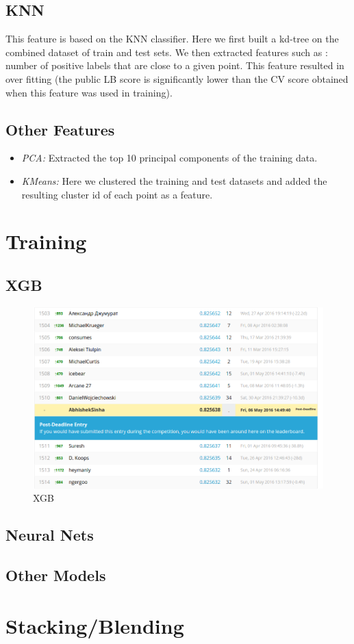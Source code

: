 \documentclass{article}
\begin{document}
\subsection{KNN}
This feature is based on the KNN classifier. Here we first built a kd-tree on the combined dataset of train and test sets. We then
extracted features such as : number of positive labels that are close to a given point. This feature resulted in over fitting (the public LB score is significantly lower than the CV score obtained when this feature was used in training).
\subsection{Other Features}
\begin{itemize}
\item \textit{PCA:} Extracted the top 10 principal components of the training data.
\item \textit{KMeans:} Here we clustered the training and test datasets and added the resulting cluster id of each point as a feature.
\end{itemize}
\section{Training}
\subsection{XGB}
\begin{figure}[tbh]
\includegraphics[scale = 0.4]{xgb}
\caption{XGB}
\label{4a}
\end{figure}
\subsection{Neural Nets}
\subsection{Other Models}
\section{Stacking/Blending}
\end{document}
